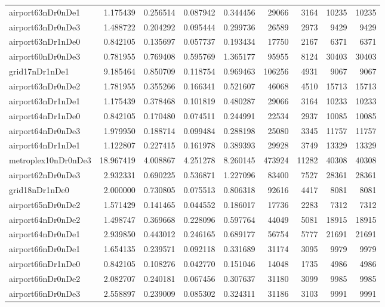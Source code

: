 \documentclass[../../../thesis.tex]{subfiles}
\begin{document}
\begin{longtable}{|l|r|r|r|r|r|r|r|r|}
airport63nDr0nDe1 & 1.175439 & 0.256514 & 0.087942 & 0.344456 & 29066 & 3164 & 10235 & 10235 \\
airport63nDr0nDe3 & 1.488722 & 0.204292 & 0.095444 & 0.299736 & 26589 & 2973 & 9429 & 9429 \\
airport63nDr1nDe0 & 0.842105 & 0.135697 & 0.057737 & 0.193434 & 17750 & 2167 & 6371 & 6371 \\
airport60nDr0nDe3 & 0.781955 & 0.769408 & 0.595769 & 1.365177 & 95955 & 8124 & 30403 & 30403 \\
grid17nDr1nDe1 & 9.185464 & 0.850709 & 0.118754 & 0.969463 & 106256 & 4931 & 9067 & 9067 \\
airport63nDr0nDe2 & 1.781955 & 0.355266 & 0.166341 & 0.521607 & 46068 & 4510 & 15713 & 15713 \\
airport63nDr1nDe1 & 1.175439 & 0.378468 & 0.101819 & 0.480287 & 29066 & 3164 & 10233 & 10233 \\
airport64nDr1nDe0 & 0.842105 & 0.170480 & 0.074511 & 0.244991 & 22534 & 2937 & 10085 & 10085 \\
airport64nDr0nDe3 & 1.979950 & 0.188714 & 0.099484 & 0.288198 & 25080 & 3345 & 11757 & 11757 \\
airport64nDr1nDe1 & 1.122807 & 0.227415 & 0.161978 & 0.389393 & 29928 & 3749 & 13329 & 13329 \\
metroplex10nDr0nDe3 & 18.967419 & 4.008867 & 4.251278 & 8.260145 & 473924 & 11282 & 40308 & 40308 \\
airport62nDr0nDe3 & 2.932331 & 0.690225 & 0.536871 & 1.227096 & 83400 & 7527 & 28361 & 28361 \\
grid18nDr1nDe0 & 2.000000 & 0.730805 & 0.075513 & 0.806318 & 92616 & 4417 & 8081 & 8081 \\
airport65nDr0nDe2 & 1.571429 & 0.141465 & 0.044552 & 0.186017 & 17736 & 2283 & 7312 & 7312 \\
airport64nDr0nDe2 & 1.498747 & 0.369668 & 0.228096 & 0.597764 & 44049 & 5081 & 18915 & 18915 \\
airport64nDr0nDe1 & 2.939850 & 0.443012 & 0.246165 & 0.689177 & 56754 & 5777 & 21691 & 21691 \\
airport66nDr0nDe1 & 1.654135 & 0.239571 & 0.092118 & 0.331689 & 31174 & 3095 & 9979 & 9979 \\
airport66nDr1nDe0 & 0.842105 & 0.108276 & 0.042770 & 0.151046 & 14048 & 1735 & 4986 & 4986 \\
airport66nDr0nDe2 & 2.082707 & 0.240181 & 0.067456 & 0.307637 & 31180 & 3099 & 9985 & 9985 \\
airport66nDr0nDe3 & 2.558897 & 0.239009 & 0.085302 & 0.324311 & 31186 & 3103 & 9991 & 9991 \\

\end{longtable}
\end{document}
